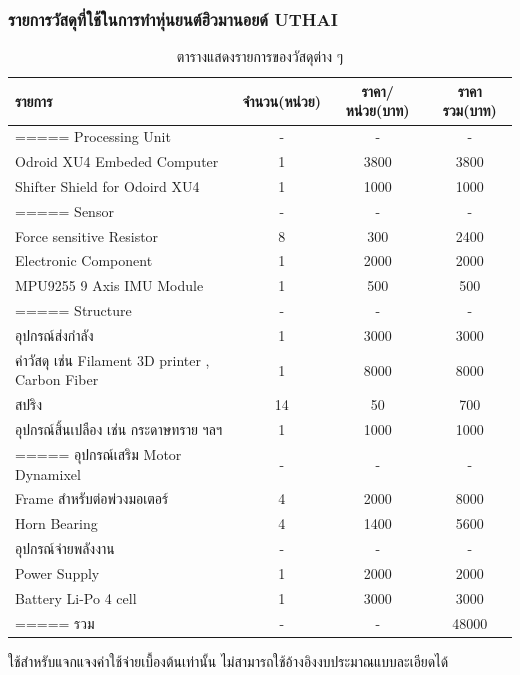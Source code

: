 \subsubsection{รายการวัสดุที่ใช้ในการทำหุ่นยนต์ฮิวมานอยด์ UTHAI}
\begin{table}[ht]
	\centering
	\begin{tabular}{| l | c | c | c|}
		\hline
		รายการ & จำนวน(หน่วย) & ราคา/หน่วย(บาท) & ราคารวม(บาท) \\
		\hline
		===== Processing Unit & - & - & -\\
		Odroid XU4 Embeded Computer & 1 & 3800 & 3800\\
		Shifter Shield for Odoird XU4 & 1 & 1000 & 1000\\
		===== Sensor & - & - & -\\
		Force sensitive Resistor & 8 & 300 & 2400\\
		Electronic Component & 1 & 2000 & 2000\\
		MPU9255 9 Axis IMU Module & 1 & 500 & 500\\
		===== Structure & - & - & -\\
		อุปกรณ์ส่งกำลัง & 1 & 3000 & 3000\\
		ค่าวัสดุ เช่น Filament 3D printer , Carbon Fiber & 1 & 8000 & 8000\\
		สปริง & 14 & 50 & 700\\
		อุปกรณ์สิ้นเปลือง เช่น กระดาษทราย ฯลฯ & 1 & 1000 & 1000\\
		===== อุปกรณ์เสริม Motor Dynamixel & - & - & -\\
		Frame สำหรับต่อพ่วงมอเตอร์ & 4 & 2000 & 8000\\
		Horn Bearing & 4 & 1400 & 5600\\
		อุปกรณ์จ่ายพลังงาน & - & - & -\\
		Power Supply & 1 & 2000 & 2000\\
		Battery Li-Po 4 cell & 1 & 3000 & 3000\\
		===== รวม & - & - & 48000\\
		\hline
	\end{tabular}
	\caption{ตารางแสดงรายการของวัสดุต่าง ๆ}
	\label{tab:matrial_buyer}
\end{table}
ใช้สำหรับแจกแจงค่าใช้จ่ายเบื้องต้นเท่านั้น ไม่สามารถใช้อ้างอิงงบประมาณแบบละเอียดได้

